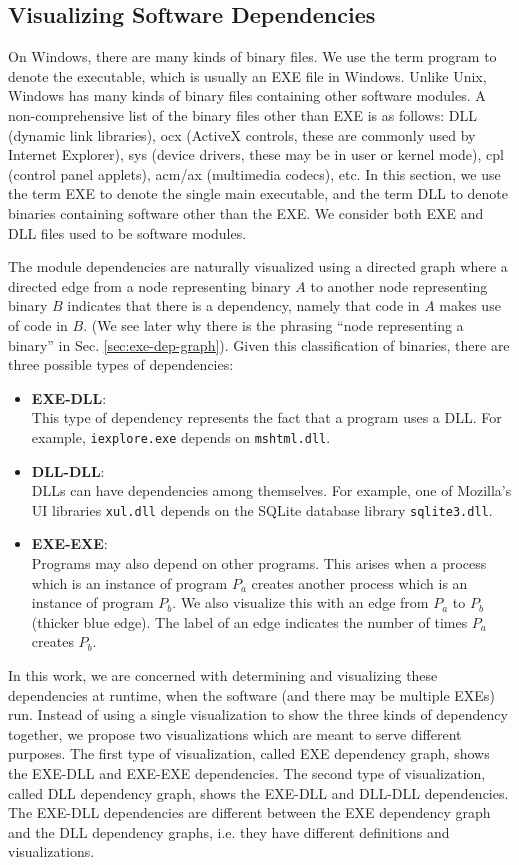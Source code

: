 \subsection{Visualizing Software Dependencies}

On Windows, there are many kinds of binary files.
We use the term program to denote the executable, which
is usually an EXE file in Windows.
Unlike Unix, Windows has many kinds of binary files containing
other software modules.
A non-comprehensive list of the binary files other than EXE
is as follows:
DLL (dynamic link libraries), ocx (ActiveX controls,
these are commonly used by Internet Explorer), sys (device
drivers, these may be in user or kernel mode), cpl (control panel applets),
acm/ax (multimedia codecs), etc.
In this section, we use the term EXE to denote the single main executable,
and the term DLL to denote binaries containing software other than the EXE.
We consider both EXE and DLL files used to be software modules.

The module dependencies are naturally visualized using a directed graph where
a directed edge from a node representing binary $A$ to another
node representing binary $B$ indicates that there is
a dependency, namely that code in $A$ makes use of code in $B$.
(We see later why there is the phrasing ``node representing a binary'' in
Sec. \ref{sec:exe-dep-graph}).
Given this classification of binaries, there are three possible
types of dependencies:
\begin{itemize}
\item {\bf EXE-DLL}: \\
This type of dependency represents the fact that a program uses a DLL.
For example, {\tt iexplore.exe} depends on {\tt mshtml.dll}.
\item {\bf DLL-DLL}: \\
DLLs can have dependencies among themselves.
For example, one of Mozilla's UI libraries {\tt xul.dll} depends on the SQLite
database library {\tt sqlite3.dll}.
\item {\bf EXE-EXE}: \\
Programs may also depend on other programs. This arises when a process
which is an instance of program $P_a$ creates another process
which is an instance of program $P_b$.
We also visualize this with an edge from $P_a$ to $P_b$ (thicker blue edge).
The label of an edge indicates the number of times $P_a$ creates $P_b$.
\end{itemize}

In this work, we are concerned with determining and visualizing these
dependencies at runtime, when the software (and there may be multiple
EXEs) run.
Instead of using a single visualization to show the three kinds of dependency
together, we propose two visualizations which are meant
to serve different purposes.
The first type of visualization, called EXE dependency graph,
shows the EXE-DLL and EXE-EXE dependencies.
The second type of visualization, called DLL dependency graph,
shows the EXE-DLL and DLL-DLL dependencies.
The EXE-DLL dependencies are different between the EXE dependency
graph and the DLL dependency graphs, i.e. they have different definitions
and visualizations.

